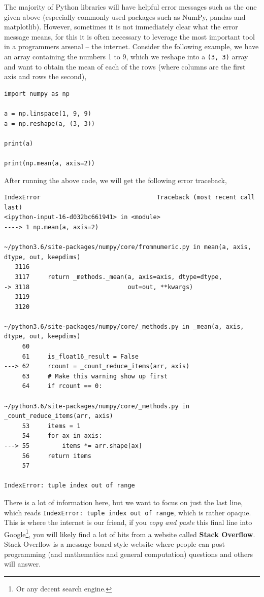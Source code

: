 \documentclass[a4paper]{article}
\begin{document}
The majority of Python libraries will have helpful error messages such as the one given above (especially commonly used packages such as NumPy, pandas and matplotlib).
However, sometimes it is not immediately clear what the error message means, for this it is often necessary to leverage the most important tool in a programmers arsenal -- the internet.
Consider the following example, we have an array containing the numbers 1 to 9, which we reshape into a \texttt{(3, 3)} array and want to obtain the mean of each of the rows (where columns are the first axis and rows the second),
\begin{lstlisting}
import numpy as np

a = np.linspace(1, 9, 9)
a = np.reshape(a, (3, 3))

print(a)

print(np.mean(a, axis=2))
\end{lstlisting}
After running the above code, we will get the following error traceback,
\begin{lstlisting}
IndexError                                Traceback (most recent call last)
<ipython-input-16-d032bc661941> in <module>
----> 1 np.mean(a, axis=2)

~/python3.6/site-packages/numpy/core/fromnumeric.py in mean(a, axis, dtype, out, keepdims)
   3116
   3117     return _methods._mean(a, axis=axis, dtype=dtype,
-> 3118                           out=out, **kwargs)
   3119
   3120

~/python3.6/site-packages/numpy/core/_methods.py in _mean(a, axis, dtype, out, keepdims)
     60
     61     is_float16_result = False
---> 62     rcount = _count_reduce_items(arr, axis)
     63     # Make this warning show up first
     64     if rcount == 0:

~/python3.6/site-packages/numpy/core/_methods.py in _count_reduce_items(arr, axis)
     53     items = 1
     54     for ax in axis:
---> 55         items *= arr.shape[ax]
     56     return items
     57

IndexError: tuple index out of range
\end{lstlisting}
There is a lot of information here, but we want to focus on just the last line, which reads \texttt{IndexError: tuple index out of range}, which is rather opaque.
This is where the internet is our friend, if you \emph{copy and paste} this final line into Google\footnote{Or any decent search engine.}, you will likely find a lot of hits from a website called \textbf{Stack Overflow}.
Stack Overflow is a message board style website where people can post programming (and mathematics and general computation) questions and others will answer.
\end{document}
